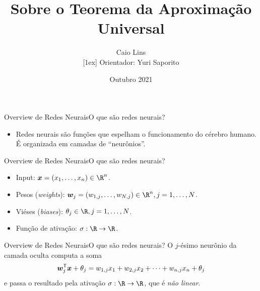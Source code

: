 \documentclass[13pt]{beamer}
\title[Teorema da Aproximação Universal]{Sobre o Teorema da Aproximação Universal}
\author[C. Lins]{Caio Lins \texorpdfstring{\\}{}[1ex]  {\small Orientador: Yuri Saporito}}
\institute[EMAp]{FGV - EMAp}
\date[EMAp 2021]{Outubro 2021}
\begin{document}
\maketitle


\begin{frame}{Overview de Redes Neurais}{O que são redes neurais?}
    \begin{itemize}
        \item Redes neurais são funções que espelham o funcionamento do cérebro humano.
            É organizada em camadas de ``neurônios''.
    \end{itemize}
    \begin{figure}
        \begin{center}
            
        \end{center}
    \end{figure}
\end{frame}

\begin{frame}{Overview de Redes Neurais}{O que são redes neurais?}
    \begin{itemize}
        \item Input: \( \bfx = ( x_{ 1 }, \dots, x_{ n } ) \in \R^{ n } \).
        \item Pesos (\emph{weights}): \( \bfw_{ j } = ( w_{ 1, j }, \dots, w_{ N, j } ) \in \R^{ n }, j = 1, \dots, N \).
        \item Viéses (\emph{biases}): \( \theta_{ j } \in \R , j = 1, \dots, N\).
        \item Função de ativação: \( \sigma : \R \to \R \).
    \end{itemize}
    \begin{center}
        
    \end{center}
\end{frame}

\begin{frame}{Overview de Redes Neurais}{O que são redes neurais?}
    \vspace{2pt}
    O \( j \)-ésimo neurônio da camada oculta computa a soma
    \begin{equation*}
        \bm{w}_{ j }^{ \mathsf{T} } \bm{x} + \theta_{ j } = w_{ 1, j }x_{ 1 } + w_{ 2,j } x_{ 2 } + \cdots + w_{ n, j } x_{ n } + \theta_{ j }
    \end{equation*}
    e passa o resultado pela ativação \( \sigma : \R \to \R \), que é \emph{não linear}.
    \begin{center}
        
    \end{center}
\end{frame}
\end{document}
